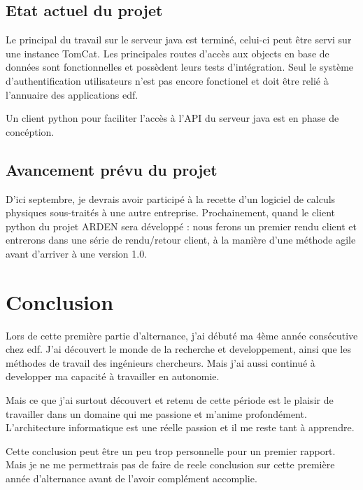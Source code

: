 \justify
\subsection{Etat actuel du projet}

Le principal du travail sur le serveur java est terminé, celui-ci peut être servi sur une instance TomCat. Les principales routes d'accès aux objects en base de données sont fonctionnelles et possèdent leurs tests d'intégration. Seul le système d'authentification utilisateurs n'est pas encore fonctionel et doit être relié à l'annuaire des applications \gls{edf}.

Un client python pour faciliter l'accès à l'API du serveur java est en phase de concéption.

\subsection{Avancement prévu du projet}

D'ici septembre, je devrais avoir participé à la recette d'un logiciel de calculs physiques sous-traités à une autre entreprise.
Prochainement, quand le client python du projet ARDEN sera développé : nous ferons un premier rendu client et entrerons dans une série de rendu/retour client, à la manière d'une méthode agile avant d'arriver à une version 1.0.
\clearpage

\section{Conclusion}

Lors de cette première partie d'alternance, j'ai débuté ma 4ème année consécutive chez \gls{edf}. J'ai découvert le monde de la recherche et developpement, ainsi que les méthodes de travail des ingénieurs chercheurs. Mais j'ai aussi continué à developper ma capacité à travailler en autonomie.

Mais ce que j'ai surtout découvert et retenu de cette période est le plaisir de travailler dans un domaine qui me passione et m'anime profondément. L'architecture informatique est une réelle passion et il me reste tant à apprendre. 

Cette conclusion peut être un peu trop personnelle pour un premier rapport. Mais je ne me permettrais pas de faire de reele conclusion sur cette première année d'alternance avant de l'avoir complément accomplie.